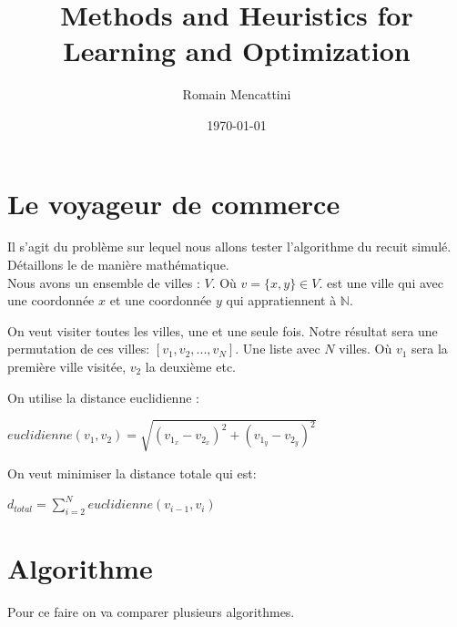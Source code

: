 \documentclass[a4paper, 11pt]{article}
\title{Methods and Heuristics for Learning and Optimization}
\author{Romain Mencattini}
\date{\today}
\begin{document}
\maketitle
\newpage
\tableofcontents
\newpage

\section{Le voyageur de commerce}
Il s'agit du problème sur lequel nous allons tester l'algorithme du recuit simulé.\\
Détaillons le de manière mathématique.\\
Nous avons un ensemble de villes : $V$. Où $v = \{x,y\} \in V$. est une ville qui avec une coordonnée $x$ et une coordonnée $y$ qui appratiennent 
à $\mathbb{N}$.

On veut visiter toutes les villes, une et une seule fois. Notre résultat sera une permutation de ces villes: $[v_1,v_2,...,v_N]$.
Une liste avec $N$ villes. Où $v_1$ 
sera la première ville visitée, $v_2$ la deuxième etc.

On utilise la distance euclidienne :
\begin{center}
\begin{math}
 euclidienne(v_1,v_2) = \sqrt{(v_{1_x} - v_{2_x})^2 + (v_{1_y} - v_{2_y})^2}
\end{math} 
\end{center}

On veut minimiser la distance totale qui est:
\begin{center}
 \begin{math}
  d_{total} = \sum\limits_{i=2}^{N} euclidienne(v_{i-1},v_i)
 \end{math}
\end{center}



\section{Algorithme}
Pour ce faire on va comparer plusieurs algorithmes.
\end{document}
